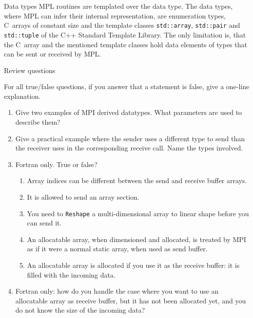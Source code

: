 \begin{mplnote}{Data types}
  MPL routines are templated over the data type.  The data types,
  where MPL can infer their internal representation, are enumeration
  types, C~arrays of constant size and the template classes
  \lstinline+std::array+,
  \lstinline+std::pair+ and
  \lstinline+std::tuple+
  of the C++ Standard Template
  Library. The only limitation is, that the C~array and the mentioned
  template classes hold data elements of types that can be sent or
  received by MPL.
\end{mplnote}








\newpage
{} {Review questions}

For all true/false questions, if you answer that a statement is false,
give a one-line explanation.

\begin{enumerate}
\item Give two examples of MPI derived datatypes. What parameters are used
to describe them?

\item Give a practical example where the sender uses a different type to send
  than the receiver uses in the corresponding receive call. Name the types involved.

\item Fortran only. True or false?
  \begin{enumerate}
  \item Array indices can be different between the send and receive buffer arrays.
  \item It is allowed to send an array section.
  \item You need to \lstinline{Reshape} a multi-dimensional array
    to linear shape before you can send it.
  \item An allocatable array, when dimensioned and allocated, is
    treated by MPI as if it were a normal static array, when used as
    send buffer.
  \item An allocatable array is allocated if you use it as the receive
    buffer: it is filled with the incoming data.
  \end{enumerate}
\item Fortran only: how do you handle the case where you want to use
  an allocatable array as receive buffer, but it has not been
  allocated yet, and you do not know the size of the incoming data?

\end{enumerate}

